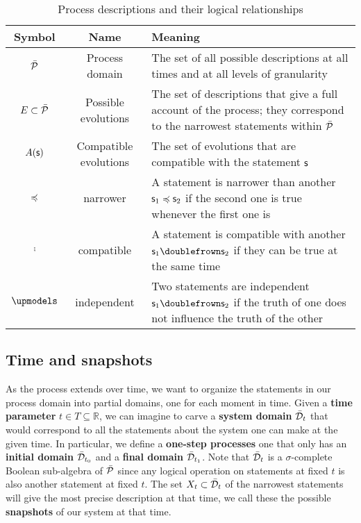 \documentclass[letterpaper]{article}
\begin{document}
\begin{table}[h!]
	\centering
\begin{tabular}[h]{|c|c|p{6cm}|}
	\hline 
	Symbol & Name & Meaning \\ 
	\hline 
	$\tdomain[P]$ & Process domain & The set of all possible descriptions at all times and at all levels of granularity \\ 
	\hline 
	$E \subset \tdomain[P]$ & Possible evolutions & The set of descriptions that give a full account of the process; they correspond to the narrowest statements within $\tdomain[P]$ \\ 
	\hline 
	$A(\stmt)$ & Compatible evolutions & The set of evolutions that are compatible with the statement $\stmt$ \\ 
	\hline 
	$\narrower$ & narrower & A statement is narrower than another $\stmt_1 \narrower \stmt_2$ if the second one is true whenever the first one is \\ 
	\hline 
	$\comp$ & compatible & A statement is compatible with another $\stmt_1 \comp \stmt_2$ if they can be true at the same time \\ 
	\hline 
	$\indep$ & independent & Two statements are independent  $\stmt_1 \comp \stmt_2$ if the truth of one does not influence the truth of the other \\ 
\hline 
\end{tabular} 
	\caption{Process descriptions and their logical relationships}
	\label{table:logic}
\end{table}


\subsection{Time and snapshots}

As the process extends over time, we want to organize the statements in our process domain into partial domains, one for each moment in time. Given a \textbf{time parameter} $t \in T \subseteq \mathbb{R}$, we can imagine to carve a \textbf{system domain} $\tdomain_t$ that would correspond to all the statements about the system one can make at the given time. In particular, we define a \textbf{one-step processes} one that only has an \textbf{initial domain} $\tdomain_{t_0}$ and a \textbf{final domain} $\tdomain_{t_1}$. Note that $\tdomain_t$ is a $\sigma$-complete Boolean sub-algebra of $\tdomain[P]$ since any logical operation on statements at fixed $t$ is also another statement at fixed $t$. The set $X_t \subset \tdomain_t$ of the narrowest statements will give the most precise description at that time, we call these the  possible \textbf{snapshots} of our system at that time. 
\end{document}
